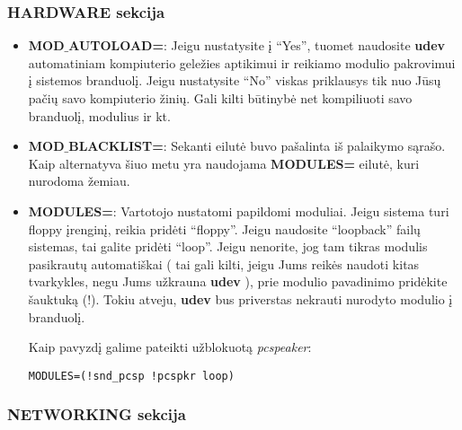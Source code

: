 \subsubsection{HARDWARE sekcija}

\begin{itemize}
  \item \textbf{MOD$\_$AUTOLOAD=}: Jeigu nustatysite į ``Yes'', tuomet
    naudosite \textbf{udev} automatiniam kompiuterio geležies
    aptikimui ir reikiamo modulio pakrovimui į sistemos
    branduolį. Jeigu nustatysite ``No'' viskas priklausys tik nuo Jūsų
    pačių savo kompiuterio žinių. Gali kilti būtinybė net kompiliuoti
    savo branduolį, modulius ir kt.
  \item \textbf{MOD$\_$BLACKLIST=}: Sekanti eilutė buvo pašalinta iš
    palaikymo sąrašo. Kaip alternatyva šiuo metu yra naudojama
    \textbf{MODULES=} eilutė, kuri nurodoma žemiau.
  \item \textbf{MODULES=}: Vartotojo nustatomi papildomi
    moduliai. Jeigu sistema turi floppy įrenginį, reikia pridėti
    ``floppy''. Jeigu naudosite ``loopback'' failų sistemas, tai
    galite pridėti ``loop''. Jeigu nenorite, jog tam tikras modulis
    pasikrautų automatiškai ( tai gali kilti, jeigu Jums reikės
    naudoti kitas tvarkykles, negu Jums užkrauna \textbf{udev} ), prie
    modulio pavadinimo pridėkite šauktuką (!). Tokiu atveju,
    \textbf{udev} bus priverstas nekrauti nurodyto modulio į
    branduolį. 

    Kaip pavyzdį galime pateikti užblokuotą \textsl{pcspeaker}:

    \begin{verbatim}
MODULES=(!snd_pcsp !pcspkr loop)
    \end{verbatim}
\end{itemize}

\subsubsection{NETWORKING sekcija}

